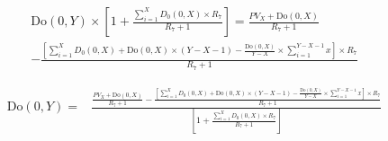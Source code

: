 \documentclass[12pt]{article}
\begin{document}
\begin{gather*}
\text{Do}(0, Y) \times \left[1+ \frac{ \sum_{i=1}^{X} D_0(0, X) \times R_7}{R_7 + 1} \right] = 
\frac{PV_{X}^{} + \text{Do}(0,X)}{R_7 + 1}
\\
- \frac{\left[\sum_{i=1}^{X} D_0(0, X) + \text{Do}(0,X) \times (Y-X-1) - \frac{\text{Do}(0, X)}{Y-X} \times \sum_{i=1}^{Y-X-1}x \right] \times R_7}{R_7 + 1}
\end{gather*}

\begin{equation}
\begin{split}
\text{Do}(0, Y) = &\frac{\frac{PV_{X}^{} + \text{Do}(0,X)}{R_7 + 1} - \frac{\left[\sum_{i=1}^{X} D_0(0, X) + \text{Do}(0,X) \times (Y-X-1) - \frac{\text{Do}(0, X)}{Y-X} \times \sum_{i=1}^{Y-X-1}x \right] \times R_7}{R_7 + 1}}{\left[1+ \frac{ \sum_{i=1}^{X} D_0(0, X) \times R_7}{R_7 + 1} \right]}
\end{split}
\end{equation}
\end{document}
